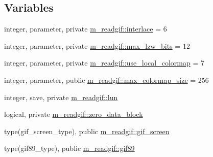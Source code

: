 \subsection*{Variables}
\begin{DoxyCompactItemize}
\item 
integer, parameter, private \mbox{\hyperlink{namespacem__readgif_af71b0131b0327843ab00d56288f1e4a3}{m\+\_\+readgif\+::interlace}} = 6
\item 
integer, parameter, private \mbox{\hyperlink{namespacem__readgif_a42041a4cc2179d606ca9a1df44a797fe}{m\+\_\+readgif\+::max\+\_\+lzw\+\_\+bits}} = 12
\item 
integer, parameter, private \mbox{\hyperlink{namespacem__readgif_abfef407c9bbae736ddf82dd2f5cc0dbc}{m\+\_\+readgif\+::use\+\_\+local\+\_\+colormap}} = 7
\item 
integer, parameter, public \mbox{\hyperlink{namespacem__readgif_a6bce6231298ac3b8c0fe89169eacf790}{m\+\_\+readgif\+::max\+\_\+colormap\+\_\+size}} = 256
\item 
integer, save, private \mbox{\hyperlink{namespacem__readgif_ae5e05cba63ef3a16c27f9935d6c2a24d}{m\+\_\+readgif\+::lun}}
\item 
logical, private \mbox{\hyperlink{namespacem__readgif_a3d4f20ed4d02e7e260b5e0bcae642ddd}{m\+\_\+readgif\+::zero\+\_\+data\+\_\+block}}
\item 
type(gif\+\_\+screen\+\_\+type), public \mbox{\hyperlink{namespacem__readgif_a6253fc469a2750e1d59bc498bca3d6eb}{m\+\_\+readgif\+::gif\+\_\+screen}}
\item 
type(gif89\+\_\+type), public \mbox{\hyperlink{namespacem__readgif_a1d5a3f008ce6a2b13029a0977dba1aa1}{m\+\_\+readgif\+::gif89}}
\end{DoxyCompactItemize}
